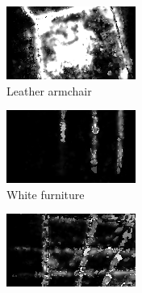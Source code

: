 \begin{figure}[h!tb]
    \begin{subfigure}[b]{0.25\textwidth}
        \centering
        \includegraphics[width=0.9\linewidth]{images/materials/leather-conf}
        \caption{Leather armchair}
        \label{fig:material-leather}
    \end{subfigure}%
    \begin{subfigure}[b]{0.25\textwidth}
        \centering
        \includegraphics[width=0.9\linewidth]{images/materials/whiteFurniture-conf}
        \caption{White furniture}
        \label{fig:material-whiteFurniture}
    \end{subfigure}%
    \begin{subfigure}[b]{0.25\textwidth}
        \centering
        \includegraphics[width=0.9\linewidth]{images/materials/tiles-conf}

\end{subfigure}
\end{figure}
